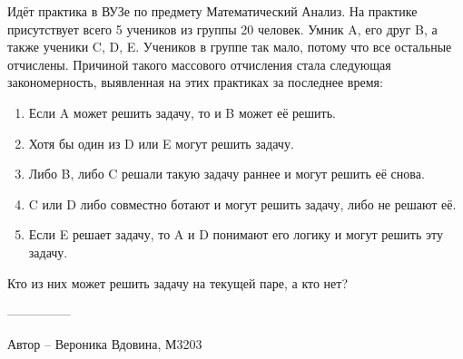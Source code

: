 \question
Идёт практика в ВУЗе по предмету Математический Анализ. На практике присутствует всего 5 учеников из группы 20 человек. Умник A, его друг B, а также ученики C, D, E. Учеников в группе так мало, потому что все остальные отчислены. Причиной такого массового отчисления стала следующая закономерность, выявленная на этих практиках за последнее время:

\begin{enumerate}
    \item Если A может решить задачу, то и B может её решить.
\item Хотя бы один из D или E могут решить задачу.
\item Либо B, либо C решали такую задачу раннее и могут решить её снова.
\item C или D либо совместно ботают и могут решить задачу, либо не решают её.
\item Если E решает задачу, то A и D понимают его логику и могут решить эту задачу.
\end{enumerate}
Кто из них может решить задачу на текущей паре, а кто нет?

---------------

Автор -- Вероника Вдовина, М3203